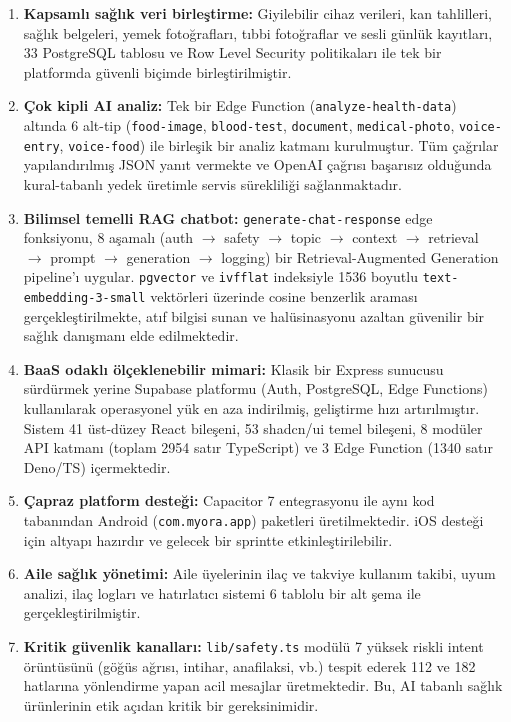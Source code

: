 \begin{enumerate}
    \item \textbf{Kapsamlı sağlık veri birleştirme:} Giyilebilir cihaz verileri, kan tahlilleri, sağlık belgeleri, yemek fotoğrafları, tıbbi fotoğraflar ve sesli günlük kayıtları, 33 PostgreSQL tablosu ve Row Level Security politikaları ile tek bir platformda güvenli biçimde birleştirilmiştir.

    \item \textbf{Çok kipli AI analiz:} Tek bir Edge Function (\texttt{analyze-health-data}) altında 6 alt-tip (\texttt{food-image}, \texttt{blood-test}, \texttt{document}, \texttt{medical-photo}, \texttt{voice-entry}, \texttt{voice-food}) ile birleşik bir analiz katmanı kurulmuştur. Tüm çağrılar yapılandırılmış JSON yanıt vermekte ve OpenAI çağrısı başarısız olduğunda kural-tabanlı yedek üretimle servis sürekliliği sağlanmaktadır.

    \item \textbf{Bilimsel temelli RAG chatbot:} \texttt{generate-chat-response} edge fonksiyonu, 8 aşamalı (auth $\to$ safety $\to$ topic $\to$ context $\to$ retrieval $\to$ prompt $\to$ generation $\to$ logging) bir Retrieval-Augmented Generation pipeline'ı uygular. \texttt{pgvector} ve \texttt{ivfflat} indeksiyle 1536 boyutlu \texttt{text-embedding-3-small} vektörleri üzerinde cosine benzerlik araması gerçekleştirilmekte, atıf bilgisi sunan ve halüsinasyonu azaltan güvenilir bir sağlık danışmanı elde edilmektedir.

    \item \textbf{BaaS odaklı ölçeklenebilir mimari:} Klasik bir Express sunucusu sürdürmek yerine Supabase platformu (Auth, PostgreSQL, Edge Functions) kullanılarak operasyonel yük en aza indirilmiş, geliştirme hızı artırılmıştır. Sistem 41 üst-düzey React bileşeni, 53 shadcn/ui temel bileşeni, 8 modüler API katmanı (toplam 2954 satır TypeScript) ve 3 Edge Function (1340 satır Deno/TS) içermektedir.

    \item \textbf{Çapraz platform desteği:} Capacitor 7 entegrasyonu ile aynı kod tabanından Android (\texttt{com.myora.app}) paketleri üretilmektedir. iOS desteği için altyapı hazırdır ve gelecek bir sprintte etkinleştirilebilir.

    \item \textbf{Aile sağlık yönetimi:} Aile üyelerinin ilaç ve takviye kullanım takibi, uyum analizi, ilaç logları ve hatırlatıcı sistemi 6 tablolu bir alt şema ile gerçekleştirilmiştir.

    \item \textbf{Kritik güvenlik kanalları:} \texttt{lib/safety.ts} modülü 7 yüksek riskli intent örüntüsünü (göğüs ağrısı, intihar, anafilaksi, vb.) tespit ederek 112 ve 182 hatlarına yönlendirme yapan acil mesajlar üretmektedir. Bu, AI tabanlı sağlık ürünlerinin etik açıdan kritik bir gereksinimidir.
\end{enumerate}

